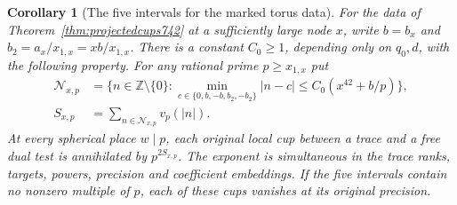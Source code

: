 \documentclass[a4paper,11pt]{article}
\newtheorem{corollary}[proposition]{Corollary}
\theoremstyle{definition}
\theoremstyle{remark}
\newcommand{\ZZ}{\mathbb Z}\newcommand{\ord}{\operatorname{ord}}
\numberwithin{equation}{section}
\begin{document}
\begin{corollary}[The five intervals for the marked torus data]
\leavevmode\label{cor:actualperiodmultiples768}
For the data of Theorem~\ref{thm:projectedcups742} at a
sufficiently large node \(x\), write \(b=b_x\) and
\(b_2=a_x/x_{1,x}=xb/x_{1,x}\). There is a constant
\(C_0\ge1\), depending only on \(q_0,d\), with the following
property. For any rational prime \(p\ge x_{1,x}\) put
\[
 \begin{aligned}
 \mathcal N_{x,p}&=\{n\in\ZZ\setminus\{0\}:
       \min_{c\in\{0,b,-b,b_2,-b_2\}}|n-c|
                            \le C_0(x^{42}+b/p)\},\\
 S_{x,p}&=\sum_{n\in\mathcal N_{x,p}}v_p(|n|).
 \end{aligned}
\]
At every spherical place \(w\mid p\), each original local
cup between a trace and a free dual test is annihilated by
\(p^{2S_{x,p}}\). The exponent is simultaneous in the trace
ranks, targets, powers, precision and coefficient embeddings.
If the five intervals contain no nonzero multiple of \(p\),
each of these cups vanishes at its original precision.
\end{corollary}
\end{document}

